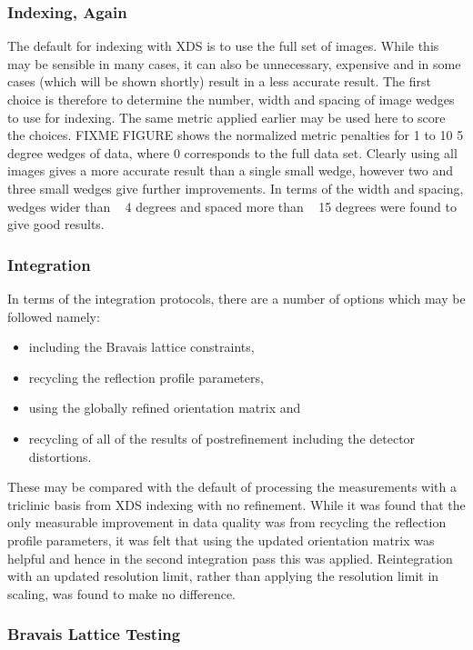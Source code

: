 \documentclass[a4paper, 11pt]{article}
\begin{document}
\subsubsection{Indexing, Again}

The default for indexing with XDS is to use the full set of images. While this may be sensible in many cases, it can also be unnecessary, expensive and in some cases (which will be shown shortly) result in a less accurate result. The first choice is therefore to determine the number, width and spacing of image wedges to use for indexing. The same metric applied earlier may be used here to score the choices. FIXME FIGURE shows the normalized metric penalties for 1 to 10 5 degree wedges of data, where 0 corresponds to the full data set. Clearly using all images gives a more accurate result than a single small wedge, however two and three small wedges give further improvements. In terms of the width and spacing, wedges wider than ~ 4 degrees and spaced more than ~ 15 degrees were found to give good results.

\subsubsection{Integration}

In terms of the integration protocols, there are a number of options which may be followed namely:

\begin{itemize}
\item{including the Bravais lattice constraints,}
\item{recycling the reflection profile parameters,}
\item{using the globally refined orientation matrix and}
\item{recycling of all of the results of postrefinement including the detector distortions.}
\end{itemize}

These may be compared with the default of processing the measurements with a triclinic basis from XDS indexing with no refinement. While it was found that the only measurable improvement in data quality was from recycling the reflection profile parameters, it was felt that using the updated orientation matrix was helpful and hence in the second integration pass this was applied. Reintegration with an updated resolution limit, rather than applying the resolution limit in scaling, was found to make no difference.

\subsubsection{Bravais Lattice Testing}
\end{document}
